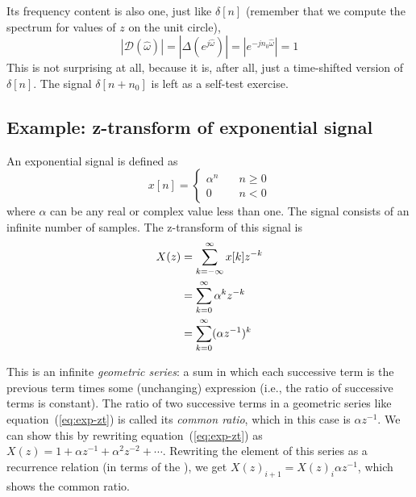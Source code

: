 Its frequency content is also one, just like $\delta[n]$ (remember
that we compute the spectrum for values of $z$ on the unit circle),
\begin{equation}
|\mathcal{D}(\hat{\omega})|=|\Delta(e^{j\hat{\omega}})|=|e^{-jn_0\hat{\omega}}|=1
\end{equation}
This is not surprising at all, because it is, after all, just a
time-shifted version of $\delta[n]$. The signal $\delta[n+n_0]$ is
left as a self-test exercise.


\subsection{Example: z-transform of exponential signal}

An exponential signal is defined as 
\begin{equation}
x[n] = \left\{\begin{array}{ll}
                        \alpha^n & \quad  n \ge 0 \\
                        0        & \quad n < 0
          \end{array}\right.
\label{eq:zt-expof}
\end{equation}
where $\alpha$ can be any real or complex value less than one. The
signal consists of an infinite number of samples. The z-transform of
this signal is
\begin{align}
X(z) &= \sum_{k=-\infty}^{\infty} x[k] z^{-k} \notag\\
     &= \sum_{k=0}^{\infty}\alpha^k  z^{-k} \notag\\
     &= \sum_{k=0}^{\infty}(\alpha z^{-1})^k
\label{eq:exp-zt}
\end{align}

This is an infinite \emph{geometric series}: a sum in which each
successive term is the previous term times some (unchanging)
expression (i.e., the ratio of successive terms is constant).
 The ratio of two successive terms in a
geometric series like 
equation~(\ref{eq:exp-zt}) is called its \emph{common ratio}, which in
this case is $\alpha z^{-1}$. We can show this by rewriting
equation~(\ref{eq:exp-zt}) as $X(z) = 1 + \alpha z^{-1} + \alpha^{2}
z^{-2} + \cdots$. Rewriting the  element of this
series as a recurrence relation (in terms of the ),
we get $X(z)_{i+1} = X(z)_i \alpha z^{-1}$, which shows the common ratio.
  
